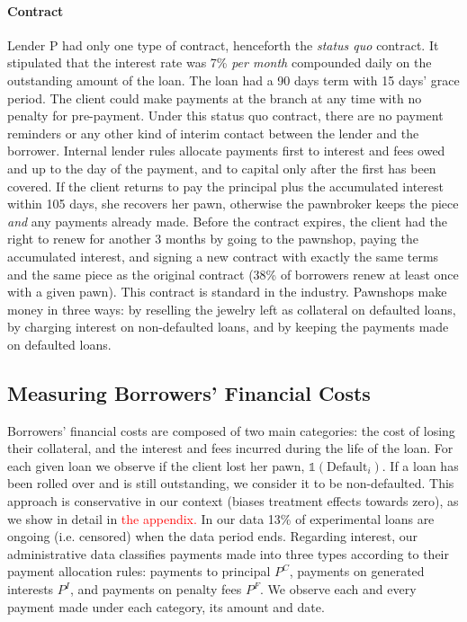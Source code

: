 \documentclass[12pt, a4paper, colorinlistoftodos]{article}
\begin{document}
\paragraph*{Contract} Lender P had only one type of contract, henceforth the \textit{status quo} contract. It stipulated that the interest rate was 7\% \textit{per month} compounded daily on the outstanding amount of the loan. The loan had a 90 days term with 15 days' grace period. The client could make payments at the branch at any time with no penalty for pre-payment. Under this status quo contract, there are no payment reminders or any other kind of interim contact between the lender and the borrower. Internal lender rules allocate payments first to interest and fees owed and up to the day of the payment, and to capital only after the first has been covered. If the client returns to pay the principal plus the accumulated interest within 105 days, she recovers her pawn, otherwise the pawnbroker keeps the piece \textit{and} any payments already made. Before the contract expires, the client had the right to renew for another 3 months by going to the pawnshop, paying the accumulated interest, and signing a new contract with exactly the same terms and the same piece as the original contract (38\% of borrowers renew at least once with a given pawn). This contract is standard in the industry.  Pawnshops make money in three ways: by reselling the jewelry left as collateral on defaulted loans, by charging interest on non-defaulted loans, and by keeping the payments made on defaulted loans. 

\subsection{Measuring Borrowers' Financial Costs} 
\label{costs}
    
Borrowers' financial costs are composed of two main categories: the cost of losing their collateral, and the interest and fees incurred during the life of the loan. For each given loan we observe if the client lost her pawn, $\mathds{1}(\text{Default}_i)$. If a loan has been rolled over and is still outstanding, we consider it to be non-defaulted.  This approach is conservative in our context (biases treatment effects towards zero), as we show in detail in \textcolor{red}{the appendix.} %
In our data 13\% of experimental loans are ongoing (i.e. censored) when the data period ends. Regarding interest, our administrative data classifies payments made into three types according to their payment allocation rules: payments to principal $P^C$, payments on generated interests $P^I$, and payments on penalty fees $P^F$. We observe each and every payment made under each category, its amount and date. 
\end{document}
